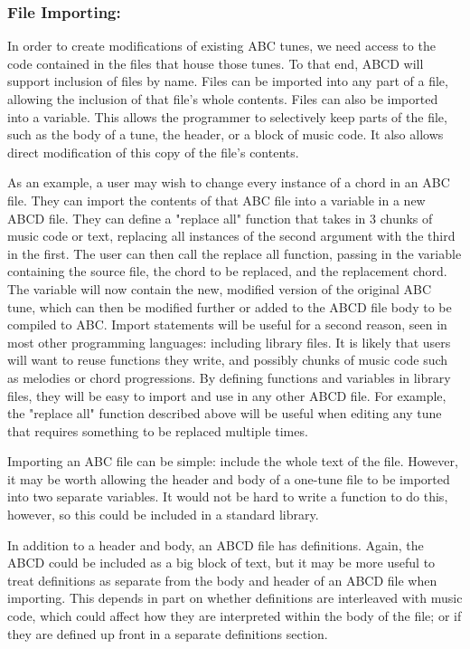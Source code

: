     \subsubsection{File Importing:}
    In order to create modifications of existing ABC tunes, we need access to the code contained in the files that house those tunes. To that end, ABCD will support inclusion of files by name. Files can be imported into any part of a file, allowing the inclusion of that file's whole contents. Files can also be imported into a variable. This allows the programmer to selectively keep parts of the file, such as the body of a tune, the header, or a block of music code. It also allows direct modification of this copy of the file's contents. 
    
    As an example, a user may wish to change every instance of a chord in an ABC file. They can import the contents of that ABC file into a variable in a new ABCD file. They can define a "replace all" function that takes in 3 chunks of music code or text, replacing all instances of the second argument with the third in the first. The user can then call the replace all function, passing in the variable containing the source file, the chord to be replaced, and the replacement chord. The variable will now contain the new, modified version of the original ABC tune, which can then be modified further or added to the ABCD file body to be compiled to ABC.
    Import statements will be useful for a second reason, seen in most other programming languages: including library files. It is likely that users will want to reuse functions they write, and possibly chunks of music code such as melodies or chord progressions. By defining functions and variables in library files, they will be easy to import and use in any other ABCD file. For example, the "replace all" function described above will be useful when editing any tune that requires something to be replaced multiple times.
    
    Importing an ABC file can be simple: include the whole text of the file. However, it may be worth allowing the header and body of a one-tune file to be imported into two separate variables. It would not be hard to write a function to do this, however, so this could be included in a standard library.
    
    In addition to a header and body, an ABCD file has definitions. Again, the ABCD could be included as a big block of text, but it may be more useful to treat definitions as separate from the body and header of an ABCD file when importing. This depends in part on whether definitions are interleaved with music code, which could affect how they are interpreted within the body of the file; or if they are defined up front in a separate definitions section.

